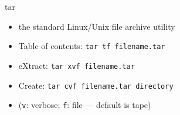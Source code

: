 \begin{frame}[fragile]{tar}
\begin{itemize}
\item the standard Linux/Unix file archive utility
\item {T}able of contents: \verb|tar tf filename.tar|
\item e{X}tract: \verb|tar xvf filename.tar|
\item {C}reate: \verb|tar cvf filename.tar directory|
\item (\verb|v|: verbose; \verb|f|: file --- default is tape)
\end{itemize}
\end{frame}
